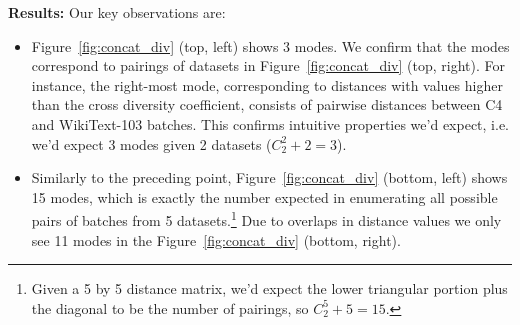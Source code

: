 \textbf{Results:}
Our key observations are:
\begin{itemize}
    \item Figure~\ref{fig:concat_div} (top, left) shows 3 modes. 
    We confirm that the modes correspond to pairings of datasets in Figure~\ref{fig:concat_div} (top, right). 
    For instance, the right-most mode, corresponding to distances with values higher than the cross diversity coefficient, consists of pairwise distances between C4 and WikiText-103 batches. 
    This confirms intuitive properties we'd expect, i.e. we'd expect 3 modes given 2 datasets ($C^2_2 + 2 = 3$).
    \item Similarly to the preceding point, Figure~\ref{fig:concat_div} (bottom, left) shows 15 modes, which is exactly the number expected in enumerating all possible pairs of batches from 5 datasets.\footnote{Given a 5 by 5 distance matrix, we'd expect the lower triangular portion plus the diagonal to be the number of pairings, so $C^5_2 + 5 = 15$.}
    Due to overlaps in distance values we only see 11 modes in the Figure~\ref{fig:concat_div} (bottom, right).

\end{itemize}
